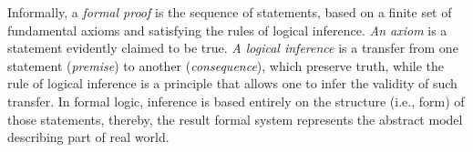 \documentclass[article]{aaltoseries}
\begin{document}

Informally, a \textit{formal proof} is the sequence of statements, based on a finite set of fundamental axioms and satisfying the rules of logical inference. \textit{An axiom} is a statement evidently claimed to be true. \textit{A logical inference} is a transfer from one statement (\textit{premise}) to another (\textit{consequence}), which preserve truth, while the rule of logical inference is a principle that allows one to infer the validity of such transfer.
In formal logic, inference is based entirely on the structure (i.e., form) of those statements, thereby, the result formal system represents the abstract model describing part of real world.
\end{document}
